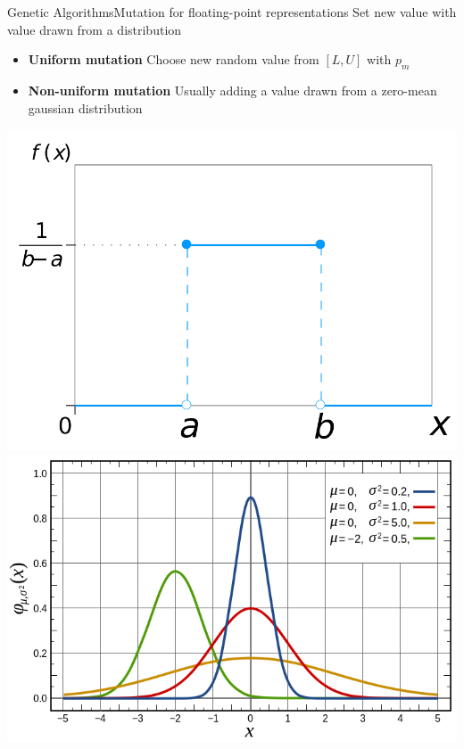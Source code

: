 \documentclass[10pt,compress]{beamer} %
\begin{document}
\begin{frame}{Genetic Algorithms}{Mutation for floating-point representations}
	Set new value with value drawn from a distribution
	\begin{itemize}
		\item \textbf{Uniform mutation} Choose new random value from $[L, U]$ with $p_m$
		\item \textbf{Non-uniform mutation} Usually adding a value drawn from a zero-mean gaussian  distribution
	\end{itemize}
	\begin{center}
	\includegraphics[width=0.4\linewidth]{figs/uniform.png}
	\includegraphics[width=0.4\linewidth]{figs/gaussian.png}
	\end{center}
\end{frame}
\end{document}
